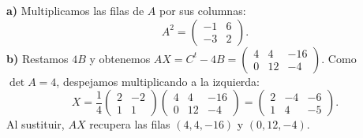 \textbf{a)} Multiplicamos las filas de $A$ por sus columnas:
\[
A^2=\boxed{\begin{pmatrix}-1&6\\-3&2\end{pmatrix}}.
\]
\textbf{b)} Restamos $4B$ y obtenemos
$AX=C^t-4B=\begin{pmatrix}4&4&-16\\0&12&-4\end{pmatrix}$.
Como $\det A=4$, despejamos multiplicando a la izquierda:
\[
X=\frac14\begin{pmatrix}2&-2\\1&1\end{pmatrix}
\begin{pmatrix}4&4&-16\\0&12&-4\end{pmatrix}
=\boxed{\begin{pmatrix}2&-4&-6\\1&4&-5\end{pmatrix}}.
\]
Al sustituir, $AX$ recupera las filas $(4,4,-16)$ y $(0,12,-4)$.
